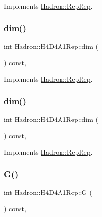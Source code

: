 Implements \mbox{\hyperlink{structHadron_1_1RepRep_a92c8802e5ed7afd7da43ccfd5b7cd92b}{Hadron\+::\+Rep\+Rep}}.

\mbox{\label{structHadron_1_1H4D4A1Rep_ac8019302ca0c70527f76bd346de43b43}} 
\subsubsection{\texorpdfstring{dim()}{dim()}\hspace{0.1cm}{\footnotesize\ttfamily [2/3]}}
{\footnotesize\ttfamily int Hadron\+::\+H4\+D4\+A1\+Rep\+::dim (\begin{DoxyParamCaption}{ }\end{DoxyParamCaption}) const\hspace{0.3cm}{\ttfamily [inline]}, {\ttfamily [virtual]}}



Implements \mbox{\hyperlink{structHadron_1_1RepRep_a92c8802e5ed7afd7da43ccfd5b7cd92b}{Hadron\+::\+Rep\+Rep}}.

\mbox{\label{structHadron_1_1H4D4A1Rep_ac8019302ca0c70527f76bd346de43b43}} 
\subsubsection{\texorpdfstring{dim()}{dim()}\hspace{0.1cm}{\footnotesize\ttfamily [3/3]}}
{\footnotesize\ttfamily int Hadron\+::\+H4\+D4\+A1\+Rep\+::dim (\begin{DoxyParamCaption}{ }\end{DoxyParamCaption}) const\hspace{0.3cm}{\ttfamily [inline]}, {\ttfamily [virtual]}}



Implements \mbox{\hyperlink{structHadron_1_1RepRep_a92c8802e5ed7afd7da43ccfd5b7cd92b}{Hadron\+::\+Rep\+Rep}}.

\mbox{\label{structHadron_1_1H4D4A1Rep_adfb4cdaba264ee24b4ab253ef4ca631c}} 
\subsubsection{\texorpdfstring{G()}{G()}\hspace{0.1cm}{\footnotesize\ttfamily [1/2]}}
{\footnotesize\ttfamily int Hadron\+::\+H4\+D4\+A1\+Rep\+::G (\begin{DoxyParamCaption}{ }\end{DoxyParamCaption}) const\hspace{0.3cm}{\ttfamily [inline]}, {\ttfamily [virtual]}}

